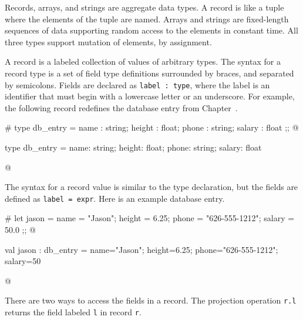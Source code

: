 
Records, arrays, and strings are aggregate data types.  A record is
like a tuple where the elements of the tuple are named.  Arrays and
strings are fixed-length sequences of data supporting random access to
the elements in constant time.  All three types support mutation of
elements, by assignment.


\label{keyword:records}
A record is a labeled collection of values of arbitrary types.  The
syntax for a record type is a set of field type definitions surrounded
by braces, and separated by semicolons.  Fields are declared as
\hbox{\lstinline/label : type/}, where the label is an identifier that must begin
with a lowercase letter or an underscore.  For example, the following
record redefines the database entry from Chapter~.

\begin{ocaml}
# type db_entry =
     { name   : string;
       height : float;
       phone  : string;
       salary : float
     };;
@
\begin{topoutput}
type db_entry = { name: string; height: float;
                  phone: string; salary: float }
\end{topoutput}
@
\end{ocaml}
%
The syntax for a record value is similar to the type declaration, but the
fields are defined as \hbox{\lstinline/label = expr/}.  Here is an example
database entry.

\begin{ocaml}
# let jason =
     { name   = "Jason";
       height = 6.25;
       phone  = "626-555-1212";
       salary = 50.0
     };;
@
\begin{topoutput}
val jason : db_entry =
  {name="Jason"; height=6.25;
   phone="626-555-1212"; salary=50}
\end{topoutput}
@
\end{ocaml}
%
\label{keyword:.}
There are two ways to access the fields in a record.  The
projection operation \hbox{\lstinline/r.l/} returns the field labeled \hbox{\lstinline/l/} in
record \hbox{\lstinline/r/}.

